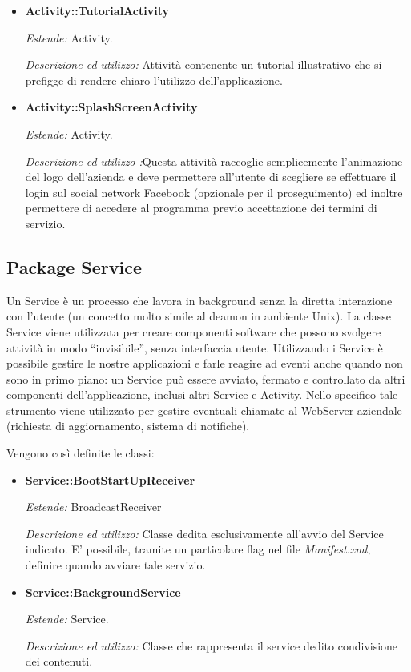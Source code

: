 \begin{itemize}
\item \textbf{Activity::TutorialActivity}

\textit{Estende:} Activity.

\textit{Descrizione ed utilizzo:} Attività contenente un tutorial illustrativo che si prefigge di rendere chiaro l'utilizzo dell'applicazione.

\item \textbf{Activity::SplashScreenActivity}

\textit{Estende:} Activity.

\textit{Descrizione ed utilizzo :}Questa attività raccoglie semplicemente l'animazione del logo dell'azienda e deve permettere all'utente di scegliere se effettuare il login sul social network Facebook (opzionale per il proseguimento) ed inoltre permettere di accedere al programma previo accettazione dei termini di servizio.

\end{itemize}
\subsection{Package Service}

Un Service è un processo che lavora in background senza la diretta interazione con l'utente (un concetto molto simile al deamon in ambiente Unix). La classe Service viene utilizzata per creare componenti software che possono svolgere attività in modo “invisibile”, senza interfaccia utente. Utilizzando i Service è possibile gestire le nostre applicazioni e farle reagire ad eventi anche quando non sono in primo piano: un Service può essere avviato, fermato e controllato da altri componenti dell'applicazione, inclusi altri Service e Activity. Nello specifico tale strumento viene utilizzato per gestire eventuali chiamate al WebServer aziendale (richiesta di aggiornamento, sistema di notifiche).

Vengono così definite le classi:
\begin{itemize}


\item \textbf{Service::BootStartUpReceiver}

\textit{Estende:} BroadcastReceiver

\textit{Descrizione ed utilizzo:} Classe dedita esclusivamente all'avvio del Service indicato. E' possibile, tramite un particolare flag nel file \textit{Manifest.xml}, definire quando avviare tale servizio.

\item \textbf{Service::BackgroundService}

\textit{Estende:} Service. 

\textit{Descrizione ed utilizzo:} Classe che rappresenta il service dedito condivisione dei contenuti.
\end{itemize}

